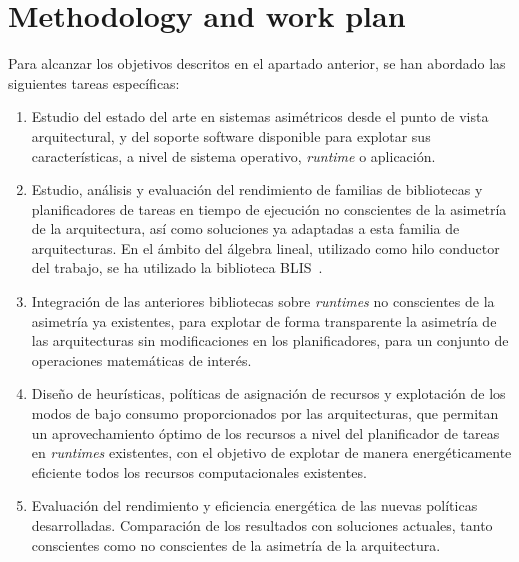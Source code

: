 \section{Methodology and work plan}
Para alcanzar los objetivos descritos en el apartado anterior, se han
abordado las siguientes tareas específicas:
\begin{enumerate}[T1.]
\item Estudio del estado del arte en sistemas asimétricos desde el punto de
  vista arquitectural, y del soporte software disponible para explotar sus
  características, a nivel de sistema operativo, \emph{runtime} o
  aplicación.
\item Estudio, análisis y evaluación del rendimiento de familias de
  bibliotecas y planificadores de tareas en tiempo de ejecución no
  conscientes de la asimetría de la arquitectura, así como soluciones ya
  adaptadas a esta familia de arquitecturas. En el ámbito del álgebra
  lineal, utilizado como hilo conductor del trabajo, se ha utilizado la
  biblioteca BLIS~\cite{BLIS1}.
\item Integración de las anteriores bibliotecas sobre \emph{runtimes} no
  conscientes de la asimetría ya existentes, para explotar de forma
  transparente la asimetría de las arquitecturas sin modificaciones en los
  planificadores, para un conjunto de operaciones matemáticas de interés.
\item Diseño de heurísticas, políticas de asignación de recursos y
  explotación de los modos de bajo consumo proporcionados por las
  arquitecturas, que permitan un aprovechamiento óptimo de los recursos a
  nivel del planificador de tareas en \emph{runtimes} existentes, con el
  objetivo de explotar de manera energéticamente eficiente todos los
  recursos computacionales existentes.
\item Evaluación del rendimiento y eficiencia energética de las nuevas
  políticas desarrolladas. Comparación de los resultados con soluciones
  actuales, tanto conscientes como no conscientes de la asimetría de la
  arquitectura.
\end{enumerate}

